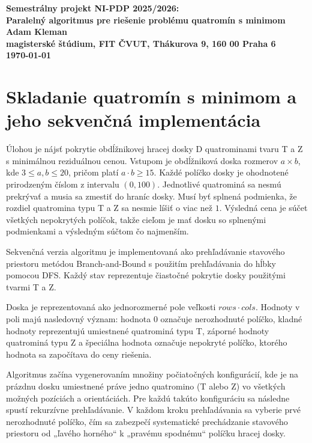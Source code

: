 \documentclass[a4paper]{article}
\begin{document}
\begin{center}
\bf Semestrálny projekt NI-PDP 2025/2026:\\[5mm]
    Paralelný algoritmus pre riešenie problému quatromín s minimom\\[5mm] 
       Adam Kleman\\[2mm]
magisterské štúdium, FIT ČVUT, Thákurova 9, 160 00 Praha 6\\[2mm]
\today
\end{center}

\section{Skladanie quatromín s minimom a jeho sekvenčná implementácia}

Úlohou je nájsť pokrytie obdĺžnikovej hracej dosky D quatrominami tvaru T a Z s minimálnou reziduálnou cenou. Vstupom je obdĺžniková doska rozmerov $a \times b$, kde $3 \leq a, b \leq 20$, pričom platí $a \cdot b \geq 15$.
Každé políčko dosky je ohodnotené prirodzeným číslom z intervalu $(0, 100)$. Jednotlivé quatrominá sa nesmú prekrývať a musia sa zmestiť do hraníc dosky. Musí byť splnená podmienka, že rozdiel quatromina typu T a Z sa nesmie líšiť o viac než $1$. 
Výsledná cena je súčet všetkých nepokrytých políčok, takže cieľom je mať dosku so splnenými podmienkami a výsledným súčtom čo najmenším.

Sekvenčná verzia algoritmu je implementovaná ako prehľadávanie stavového priestoru metódou Branch-and-Bound s použitím prehľadávania do hĺbky pomocou DFS. Každý stav reprezentuje čiastočné pokrytie dosky použitými tvarmi T a Z.

Doska je reprezentovaná ako jednorozmerné pole veľkosti $rows \cdot cols$. Hodnoty v poli majú nasledovný význam: hodnota $0$ označuje nerozhodnuté políčko, kladné hodnoty reprezentujú umiestnené quatrominá typu T, záporné hodnoty quatrominá typu Z a špeciálna hodnota označuje nepokryté políčko, ktorého hodnota sa započítava do ceny riešenia.

Algoritmus začína vygenerovaním množiny počiatočných konfigurácií, kde je na prázdnu dosku umiestnené práve jedno quatromino (T alebo Z) vo všetkých možných pozíciách a orientáciách. Pre každú takúto konfiguráciu sa následne spustí rekurzívne prehľadávanie. 
V každom kroku prehľadávania sa vyberie prvé nerozhodnuté políčko, čím sa zabezpečí systematické prechádzanie stavového priestoru od „ľavého horného“ k „pravému spodnému“ políčku hracej dosky. 
\end{document}
